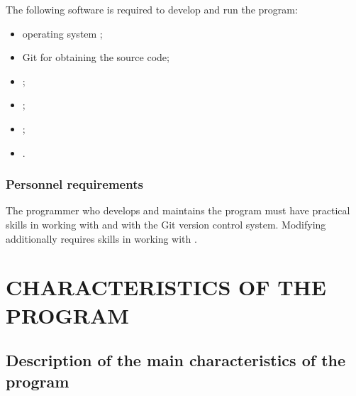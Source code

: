 \documentclass[12pt,a4paper]{extarticle}
\begin{document}
\begin{hseExample}
The following software is required to develop and run the program:

\begin{itemize}[leftmargin=1.25cm]
    \item operating system ;
    \item Git for obtaining the source code;
    \item {};
    \item {};
    \item {};
    \item {}.
\end{itemize}
\end{hseExample}

\subsubsection{Personnel requirements}

\begin{hseExample}
The programmer who develops and maintains the program must have practical skills in working with  and with the Git version control system. Modifying  additionally requires skills in working with .
\end{hseExample}

\clearpage

\section{CHARACTERISTICS OF THE PROGRAM}

\subsection{Description of the main characteristics of the program}
\end{document}
